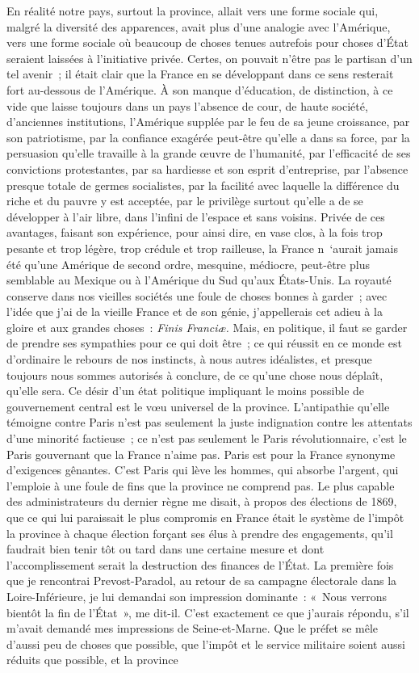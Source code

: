 \documentclass[french,twoside]{book} %
\begin{document}
En réalité notre pays, surtout la province, allait vers une forme sociale qui, malgré la diversité des apparences, avait plus d’une analogie avec l’Amérique, vers une forme sociale où beaucoup de choses tenues autrefois pour choses d’État seraient laissées à l’initiative privée. Certes, on pouvait n’être pas le partisan d’un tel avenir ; il était clair que la France en se développant dans ce sens resterait fort au-dessous de l’Amérique. À son manque d’éducation, de distinction, à ce vide que laisse toujours dans un pays l’absence de cour, de haute société, d’anciennes institutions, l’Amérique supplée par le feu de sa jeune croissance, par son patriotisme, par la confiance exagérée peut-être qu’elle a dans sa force, par la persuasion qu’elle travaille à la grande œuvre de l’humanité, par l’efficacité de ses convictions protestantes, par sa hardiesse et son esprit d’entreprise, par l’absence presque totale de germes socialistes, par la facilité avec laquelle la différence du riche et du pauvre y est acceptée, par le privilège surtout qu’elle a de se développer à l’air libre, dans l’infini de l’espace et sans voisins. Privée de ces avantages, faisant son expérience, pour ainsi dire, en vase clos, à la fois trop pesante et trop légère, trop crédule et trop railleuse, la France n ‘aurait jamais été qu’une Amérique de second ordre, mesquine, médiocre, peut-être plus semblable au Mexique ou à l’Amérique du Sud qu’aux États-Unis. La royauté conserve dans nos vieilles sociétés une foule de choses bonnes à garder ; avec l’idée que j’ai de la vieille France et de son génie, j’appellerais cet adieu à la gloire et aux grandes choses : {\itshape Finis Franciæ.} Mais, en politique, il faut se garder de prendre ses sympathies pour ce qui doit être ; ce qui réussit en ce monde est d’ordinaire le rebours de nos instincts, à nous autres idéalistes, et presque toujours nous sommes autorisés à conclure, de ce qu’une chose nous déplaît, qu’elle sera. Ce désir d’un état politique impliquant le moins possible de gouvernement central est le vœu universel de la province. L’antipathie qu’elle témoigne contre Paris n’est pas seulement la juste indignation contre les attentats d’une minorité factieuse ; ce n’est pas seulement le Paris révolutionnaire, c’est le Paris gouvernant que la France n’aime pas. Paris est pour la France synonyme d’exigences gênantes. C’est Paris qui lève les hommes, qui absorbe l’argent, qui l’emploie à une foule de fins que la province ne comprend pas. Le plus capable des administrateurs du dernier règne me disait, à propos des élections de 1869, que ce qui lui paraissait le plus compromis en France était le système de l’impôt la province à chaque élection forçant ses élus à prendre des engagements, qu’il faudrait bien tenir tôt ou tard dans une certaine mesure et dont l’accomplissement serait la destruction des finances de l’État. La première fois que je rencontrai Prevost-Paradol, au retour de sa campagne électorale dans la Loire-Inférieure, je lui demandai son impression dominante : « Nous verrons bientôt la fin de l’État », me dit-il. C’est exactement ce que j’aurais répondu, s’il m’avait demandé mes impressions de Seine-et-Marne. Que le préfet se mêle d’aussi peu de choses que possible, que l’impôt et le service militaire soient aussi réduits que possible, et la province 
\end{document}
